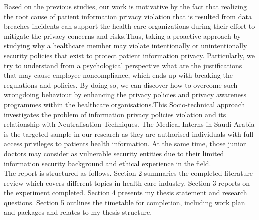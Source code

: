 Based on the previous studies, our work is motivative by the fact that realizing the root cause of patient information privacy violation that is resulted from data breaches incidents can support the health care organizations during their effort to mitigate the privacy concerns and risks.Thus, taking a proactive approach by studying why a healthcare member may violate intentionally or unintentionally security policies that exist to protect patient information privacy. Particularly, we try to understand from a psychological perspective what are the justifications that may cause employee noncompliance, which ends up with breaking the regulations and policies. By doing so, we can discover how to overcome such wrongdoing behaviour by enhancing the privacy policies and privacy awareness programmes within the healthcare organisations.This Socio-technical approach investigates the problem of information privacy policies violation and its relationship with Neutralisation Techniques. The Medical Interns in Saudi Arabia is the targeted sample in our research as they are authorised individuals with full access privileges to patients health information. At the same time, those junior doctors may consider as vulnerable security entities due to their limited information security background and ethical experience in the field. \\

The report is structured as follows. Section 2 summaries the completed literature review which covers different topics in health care industry.  Section 3 reports on the experiment completed. Section 4 presents my thesis statement and research questions. Section 5 outlines the timetable for completion, including work plan and packages and relates to my thesis structure.


